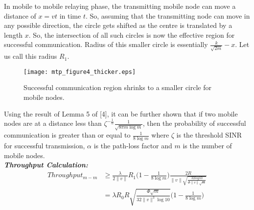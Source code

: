 \documentclass[conference]{IEEEtran}
\begin{document}
In mobile to mobile relaying phase, the transmitting mobile node can move a distance of $x=vt$ in time $t$. So, assuming that the transmitting node can move in any possible direction, the 
circle gets shifted as the centre is translated by a length $x$. So, the intersection of all such circles is now the effective region for successful communication. Radius of this smaller 
circle is essentially $\frac{k}{\sqrt{2m}}-x$. Let us call this radius $R_1$.
\begin{figure}[ht] \centering \label{con} \texttt{[image: mtp\_figure4\_thicker.eps]}\\
\caption{Successful communication region shrinks to a smaller circle for mobile nodes.} 
\vspace{0.05in}
\end{figure}
Using the result of Lemma 5 of [4], it can be further shown that if two mobile nodes are at a distance less than $\zeta^{-\frac{1}{\alpha}}\frac{1}{\sqrt{8\pi m\log m}}$, then the probability 
of successful communication is greater than or equal to $\frac{1}{8\log m}$ where $\zeta$ is the threshold SINR for successful transmission, $\alpha$ is the path-loss factor and $m$ is the number 
of mobile nodes.\\
\emph{\bf Throughput Calculation:}
\begin{align*}
Throughput_{m-m}&\geq\frac{\lambda}{2\|v\|}R_1\big(1-\frac{1}{8\log m}\big)\frac{2R}{{\|v\|}\sqrt{\frac{32log 10}{\Phi{\|v\|} \sqrt{m}}}}\\
&=\lambda R_0 R \sqrt{\frac{\Phi\sqrt{m}}{32\|v\|^3\log 10}}\big(1-\frac{1}{8\log m}\big)
\end{align*}
\end{document}
